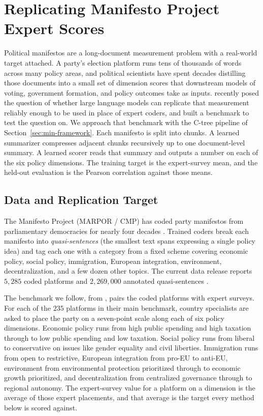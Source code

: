 \section{Replicating Manifesto Project Expert Scores}\label{sec:min-manifesto-results}

Political manifestos are a long-document measurement problem with a
real-world target attached. A party's election platform runs tens
of thousands of words across many policy areas, and political
scientists have spent decades distilling those documents into a
small set of dimension scores that downstream models of voting,
government formation, and policy outcomes take as inputs.
\citet{BenoitEtAl2025} recently posed the question of whether large
language models can replicate that measurement reliably enough to be
used in place of expert coders, and built a benchmark to test the
question on. We approach that benchmark with the C-tree pipeline of
Section~\ref{sec:min-framework}. Each manifesto is split into
chunks. A learned summarizer compresses adjacent chunks recursively
up to one document-level summary. A learned scorer reads that
summary and outputs a number on each of the six policy dimensions.
The training target is the expert-survey mean, and the held-out
evaluation is the Pearson correlation against those means.

\subsection{Data and Replication Target}\label{sec:min-manifesto-data}

The Manifesto Project (MARPOR / CMP) has coded party manifestos
from parliamentary democracies for nearly four decades
\citep{BudgeRobertsonHearl1987, BudgeEtAl2001, KlingemannEtAl2006,
VolkensEtAl2013}. Trained coders break each manifesto into
\emph{quasi-sentences} (the smallest text spans expressing a single
policy idea) and tag each one with a category from a fixed scheme
covering economic policy, social policy, immigration, European
integration, environment, decentralization, and a few dozen other
topics. The current data release reports $5{,}285$ coded platforms
and $2{,}269{,}000$ annotated quasi-sentences
\citep{ManifestoProject2025a, ManifestoCorpus2025, MerzEtAl2016}.

The benchmark we follow, from \citet{BenoitEtAl2025}, pairs the
coded platforms with expert surveys. For each of the $235$ platforms
in their main benchmark, country specialists are asked to place the
party on a seven-point scale along each of six policy dimensions.
Economic policy runs from high public spending and high taxation
through to low public spending and low taxation. Social policy runs
from liberal to conservative on issues like gender equality and
civil liberties. Immigration runs from open to restrictive,
European integration from pro-EU to anti-EU, environment from
environmental protection prioritized through to economic growth
prioritized, and decentralization from centralized governance
through to regional autonomy. The expert-survey value for a
platform on a dimension is the average of those expert placements,
and that average is the target every method below is scored
against.

